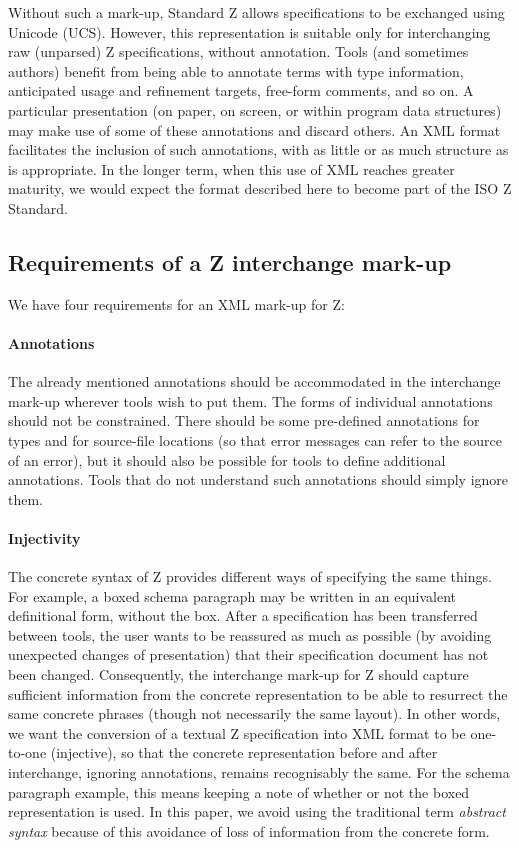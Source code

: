 \documentclass{llncs}  %
\begin{document}
Without such a mark-up, Standard Z allows specifications to be exchanged
using Unicode (UCS\cite{ISO10646-1,ISO10646-2}).
However, this representation is suitable only
for interchanging raw (unparsed) Z specifications, without annotation.
Tools (and sometimes authors) benefit from being able to annotate terms
with type information, anticipated usage and refinement targets, free-form
comments, and so on.   A particular presentation (on paper, on screen, or
within program data structures) may make use of some of these annotations
and discard others.  An XML format facilitates the inclusion of such
annotations, with as little or as much structure as is appropriate.  In
the longer term, when this use of XML reaches greater maturity, we would
expect the format described here to become part of the ISO Z Standard.


\subsection{Requirements of a Z interchange mark-up}\label{injectivity}

We have four requirements for an XML mark-up for Z:
 
\paragraph{Annotations}
The already mentioned annotations should be accommodated
in the interchange mark-up wherever tools wish to put them.
The forms of individual annotations should not be constrained.
There should be some pre-defined annotations for types and for
source-file locations (so that error messages can refer to the
source of an error), but it should also be possible for tools
to define additional annotations.  Tools that do not understand
such annotations should simply ignore them.

\paragraph{Injectivity}
The concrete syntax of Z provides different ways of specifying the 
same things.  For example, a boxed schema paragraph
may be written in an equivalent definitional form, without the box.
After a specification has been transferred between tools, the user wants
to be reassured as much as possible (by avoiding unexpected changes 
of presentation) that their specification document has not been changed.
Consequently, the interchange mark-up for Z should capture
sufficient information from the concrete representation 
to be able to resurrect the same concrete phrases
(though not necessarily the same layout).
In other words, we want the conversion of a textual Z specification into 
XML format to be one-to-one (injective), so that the concrete 
representation before and after interchange, ignoring annotations,
remains recognisably the same.
For the schema paragraph example, this means keeping a note of whether 
or not the boxed representation is used. 
In this paper, we avoid using the traditional term \textit{abstract syntax}
because of this avoidance of loss of information from the concrete form.
\end{document}
